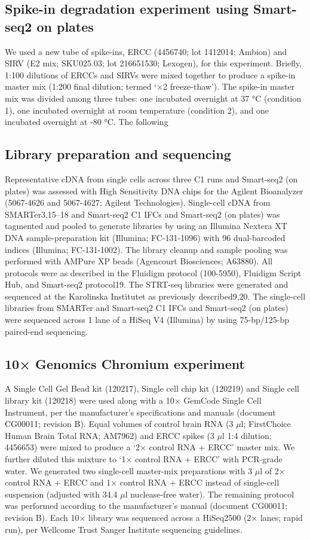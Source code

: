 \subsection{Spike-in degradation experiment using Smart-seq2 on plates}

We used a new tube of spike-ins, ERCC (4456740; lot 1412014; Ambion) and SIRV (E2 mix; SKU025.03; lot 216651530; Lexogen), for this experiment. Briefly, 1:100 dilutions of ERCCs and SIRVs were mixed together to produce a spike-in master mix (1:200 final dilution; termed ‘×2 freeze-thaw’). The spike-in master mix was divided among three tubes: one incubated overnight at 37 °C (condition 1), one incubated overnight at room temperature (condition 2), and one incubated overnight at -80 °C. The following

\subsection{Library preparation and sequencing}

Representative cDNA from single cells across three C1 runs and Smart-seq2 (on plates) was assessed with High Sensitivity DNA chips for the Agilent Bioanalyzer (5067-4626 and 5067-4627; Agilent Technologies). Single-cell cDNA from SMARTer3,15–18 and Smart-seq2 C1 IFCs and Smart-seq2 (on plates) was tagmented and pooled to generate libraries by using an Illumina Nextera XT DNA sample-preparation kit (Illumina; FC-131-1096) with 96 dual-barcoded indices (Illumina; FC-131-1002). The library cleanup and sample pooling was performed with AMPure XP beads (Agencourt Biosciences; A63880). All protocols were as described in the Fluidigm protocol (100-5950), Fluidigm Script Hub, and Smart-seq2 protocol19. The STRT-seq libraries were generated and sequenced at the Karolinska Institutet as previously described9,20. The single-cell libraries from SMARTer and Smart-seq2 C1 IFCs and Smart-seq2 (on plates) were sequenced across 1 lane of a HiSeq V4 (Illumina) by using 75-bp/125-bp paired-end sequencing.

\subsection{10× Genomics Chromium experiment}

A Single Cell Gel Bead kit (120217), Single cell chip kit (120219) and Single cell library kit (120218) were used along with a 10× GemCode Single Cell Instrument, per the manufacturer’s specifications and manuals (document CG00011; revision B). Equal volumes of control brain RNA (3 \( \mu \)l; FirstChoice Human Brain Total RNA; AM7962) and ERCC spikes (3 \( \mu \)l 1:4 dilution; 4456653) were mixed to produce a ‘2× control RNA + ERCC’ master mix. We further diluted this mixture to ‘1× control RNA + ERCC’ with PCR-grade water. We generated two single-cell master-mix preparations with 3 \( \mu \)l of 2× control RNA + ERCC and 1× control RNA + ERCC instead of single-cell suspension (adjusted with 34.4 \( \mu \)l nuclease-free water). The remaining protocol was performed according to the manufacturer’s manual (document CG00011; revision B). Each 10× library was sequenced across a HiSeq2500 (2× lanes; rapid run), per Wellcome Trust Sanger Institute sequencing guidelines.

